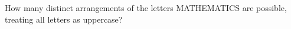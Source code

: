 How many distinct arrangements of the letters MATHEMATICS are possible, treating all letters as uppercase?
